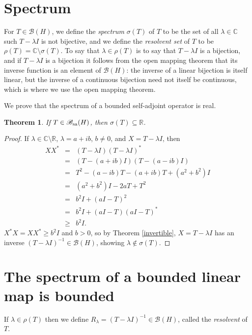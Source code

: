 \documentclass{article}
\newcommand{\SA}{\mathscr{B}_{\ensuremath\mathrm{sa}}(H)}
\newtheorem{theorem}{Theorem}
\begin{document}
\section{Spectrum}
For $T \in \mathscr{B}(H)$, we define the {\em spectrum} $\sigma(T)$ of $T$ to be the set of all $\lambda \in \mathbb{C}$ such $T-\lambda I$ is not bijective, and we
define the {\em resolvent set} of $T$ to be $\rho(T) = \mathbb{C} \setminus \sigma(T)$. 
To say that $\lambda \in \rho(T)$ is to say that $T-\lambda I$ is a bijection, and if $T-\lambda I$ is a bijection it follows from the open mapping theorem that
its inverse function is an element of $\mathscr{B}(H)$: the inverse of a linear bijection is itself linear, but the inverse of a continuous bijection need not itself be  continuous, which
is where we use the open mapping theorem.

We prove that the spectrum of a bounded self-adjoint operator is real.

\begin{theorem}
If $T \in \SA$, then $\sigma(T) \subseteq \mathbb{R}$.
\end{theorem}
\begin{proof}
If $\lambda \in \mathbb{C} \setminus \mathbb{R}$, $\lambda=a+ib$, $b \neq 0$, and $X=T-\lambda I$, then
\begin{eqnarray*}
XX^*&=&(T-\lambda I)(T-\lambda I)^*\\
&=&(T-(a+ib)I)(T-(a-ib)I)\\
&=&T^2-(a-ib)T-(a+ib)T+ (a^2+b^2)I\\
&=&(a^2+b^2)I-2aT+T^2\\
&=&b^2 I + (aI-T)^2\\
&=&b^2 I + (aI-T)(aI-T)^*\\
&\geq&b^2 I.
\end{eqnarray*}
$X^*X=XX^* \geq b^2 I$ and $b>0$, so by Theorem \ref{invertible},  $X=T-\lambda I$ has an inverse $(T-\lambda I)^{-1} \in \mathscr{B}(H)$, showing $\lambda \not \in \sigma(T)$. 
\end{proof}


\section{The spectrum of a bounded linear map is bounded}
If $\lambda \in \rho(T)$ then we define $R_\lambda= (T-\lambda I)^{-1} \in \mathscr{B}(H)$, called the {\em resolvent} of $T$.
\end{document}
